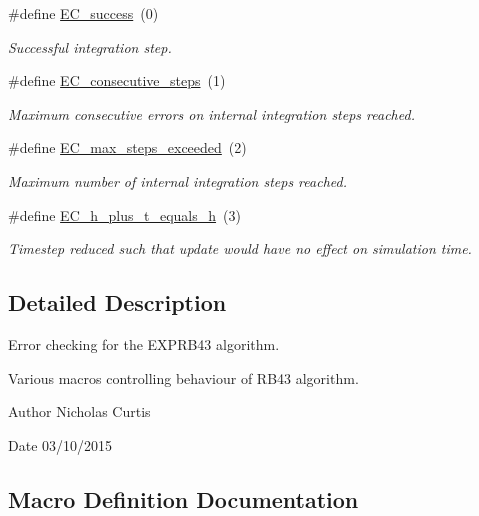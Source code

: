 \begin{DoxyCompactItemize}
\#define \hyperlink{group__exprb43cu__ErrCodes_gabd83bc0f9f475a2189a4db4a08b790ca}{E\+C\+\_\+success}~(0)
\begin{DoxyCompactList}\small\item\em Successful integration step. \end{DoxyCompactList}\item 
\#define \hyperlink{group__exprb43cu__ErrCodes_gae0287841c08f86f5709660fd731615ad}{E\+C\+\_\+consecutive\+\_\+steps}~(1)
\begin{DoxyCompactList}\small\item\em Maximum consecutive errors on internal integration steps reached. \end{DoxyCompactList}\item 
\#define \hyperlink{group__exprb43cu__ErrCodes_ga0f0275d9851ab5c19b79a963d5084df3}{E\+C\+\_\+max\+\_\+steps\+\_\+exceeded}~(2)
\begin{DoxyCompactList}\small\item\em Maximum number of internal integration steps reached. \end{DoxyCompactList}\item 
\#define \hyperlink{group__exprb43cu__ErrCodes_ga9326efd544880e2683c4453365ca2704}{E\+C\+\_\+h\+\_\+plus\+\_\+t\+\_\+equals\+\_\+h}~(3)
\begin{DoxyCompactList}\small\item\em Timestep reduced such that update would have no effect on simulation time. \end{DoxyCompactList}\end{DoxyCompactItemize}


\subsection{Detailed Description}
Error checking for the E\+X\+P\+R\+B43 algorithm. 

Various macros controlling behaviour of R\+B43 algorithm.

\begin{DoxyAuthor}{Author}
Nicholas Curtis 
\end{DoxyAuthor}
\begin{DoxyDate}{Date}
03/10/2015 
\end{DoxyDate}


\subsection{Macro Definition Documentation}
